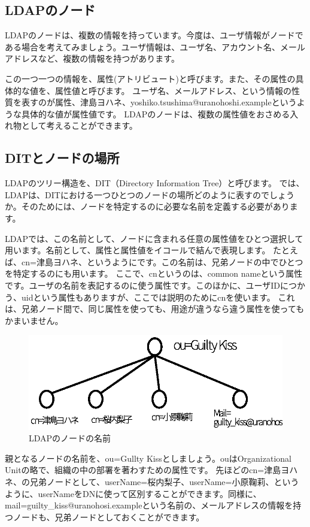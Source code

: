 \subsection{LDAPのノード}

LDAPのノードは、複数の情報を持っています。今度は、ユーザ情報がノードである場合を考えてみましょう。ユーザ情報は、ユーザ名、アカウント名、メールアドレスなど、複数の情報を持つがあります。

この一つ一つの情報を、属性(アトリビュート)と呼びます。また、その属性の具体的な値を、属性値と呼びます。
ユーザ名、メールアドレス、という情報の性質を表すのが属性、津島ヨハネ、yoshiko.tsushima@uranohoshi.exampleというような具体的な値が属性値です。
LDAPのノードは、複数の属性値をおさめる入れ物として考えることができます。


\subsection{DITとノードの場所}

LDAPのツリー構造を、DIT（Directory Information Tree）と呼びます。
では、LDAPは、DITにおける一つひとつのノードの場所どのように表すのでしょうか。そのためには、ノードを特定するのに必要な名前を定義する必要があります。

LDAPでは、この名前として、ノードに含まれる任意の属性値をひとつ選択して用います。名前として、属性と属性値をイコールで結んで表現します。
たとえば、cn=津島ヨハネ、というようにです。この名前は、兄弟ノードの中でひとつを特定するのにも用います。
ここで、cnというのは、common nameという属性です。ユーザの名前を表記するのに使う属性です。このほかに、ユーザIDにつかう、uidという属性もありますが、ここでは説明のためにcnを使います。
これは、兄弟ノード間で、同じ属性を使っても、用途が違うなら違う属性を使ってもかまいません。

\begin{figure}[htbp]
	\includegraphics[width=12cm,clip]{draw/nodename.eps}
	\caption{LDAPのノードの名前}
	\label{fig:nodename}
\end{figure}

親となるノードの名前を、ou=Gullty Kissとしましょう。ouはOrganizational Unitの略で、組織の中の部署を著わすための属性です。
先ほどのcn=津島ヨハネ、の兄弟ノードとして、userName=桜内梨子、userName=小原鞠莉、というように、userNameをDNに使って区別することができます。同様に、mail=guilty\_kiss@uranohosi.exampleという名前の、メールアドレスの情報を持つノードも、兄弟ノードとしておくことができます。

